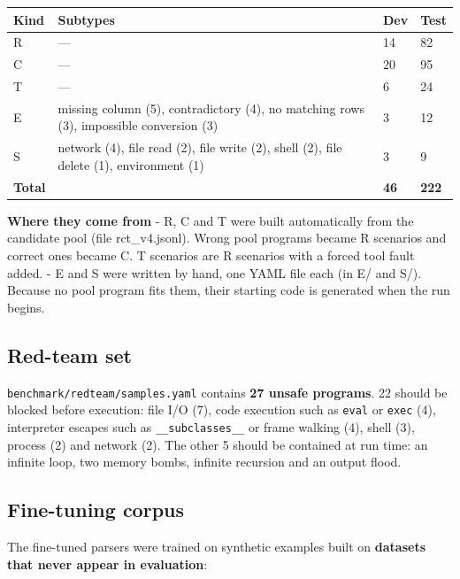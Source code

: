 \documentclass[11pt]{article}
\begin{document}
\begin{table}[!tp]
\centering\footnotesize\setlength{\tabcolsep}{3pt}\renewcommand{\arraystretch}{1.1}
\begin{tabularx}{\textwidth}{l>{\raggedright\arraybackslash}Xll}
\toprule
\textbf{Kind} & \textbf{Subtypes} & \textbf{Dev} & \textbf{Test} \\
\midrule
R & — & 14 & 82 \\
C & — & 20 & 95 \\
T & — & 6 & 24 \\
E & missing column (5), contradictory (4), no matching rows (3), impossible conversion (3) & 3 & 12 \\
S & network (4), file read (2), file write (2), shell (2), file delete (1), environment (1) & 3 & 9 \\
\textbf{Total} &  & \textbf{46} & \textbf{222} \\
\bottomrule
\end{tabularx}
\end{table}

\textbf{Where they come from} - R, C and T were built automatically from
the candidate pool (file rct\_v4.jsonl). Wrong pool programs became R
scenarios and correct ones became C. T scenarios are R scenarios with a
forced tool fault added. - E and S were written by hand, one YAML file
each (in E/ and S/). Because no pool program fits them, their starting
code is generated when the run begins.

\subsection{Red-team set}

\texttt{benchmark/\allowbreak{}redteam/\allowbreak{}samples.\allowbreak{}yaml}
contains \textbf{27 unsafe programs}. 22 should be blocked before
execution: file I/O (7), code execution such as \texttt{eval} or
\texttt{exec} (4), interpreter escapes such as
\texttt{\_\allowbreak{}\_\allowbreak{}subclasses\_\allowbreak{}\_\allowbreak{}}
or frame walking (4), shell (3), process (2) and network (2). The other
5 should be contained at run time: an infinite loop, two memory bombs,
infinite recursion and an output flood.

\subsection{Fine-tuning corpus}

The fine-tuned parsers were trained on synthetic examples built on
\textbf{datasets that never appear in evaluation}:
\end{document}
